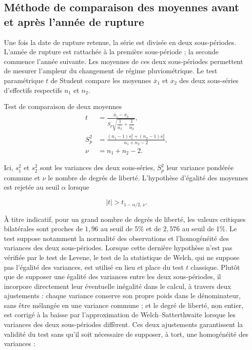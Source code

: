 \documentclass[12pt,a4paper]{report}
\begin{document}
\subsection{Méthode de comparaison des moyennes avant et après l'année de rupture}

Une fois la date de rupture retenue, la série est divisée en deux sous-périodes. L'année de rupture est rattachée à la première sous-période ; la seconde commence l'année suivante. Les moyennes de ces deux sous-périodes permettent de mesurer l'ampleur du changement de régime pluviométrique. Le test paramétrique $t$ de Student compare les moyennes $\overline{x}_1$ et $\overline{x}_2$ des deux sous-séries d'effectifs respectifs $n_1$ et $n_2$.

\begin{formulabox}{Test de comparaison de deux moyennes}
\begin{align}
t&=\frac{\overline{x}_1-\overline{x}_2}
{S_p\sqrt{\dfrac{1}{n_1}+\dfrac{1}{n_2}}},
\label{eq:student-t}\\[2mm]
S_p^2&=\frac{(n_1-1)s_1^2+(n_2-1)s_2^2}
{n_1+n_2-2},
\label{eq:variance-pooled}\\[1mm]
\nu&=n_1+n_2-2.
\label{eq:student-ddl}
\end{align}
\end{formulabox}

Ici, $s_1^2$ et $s_2^2$ sont les variances des deux sous-séries, $S_p^2$ leur variance pondérée commune et $\nu$ le nombre de degrés de liberté. L'hypothèse d'égalité des moyennes est rejetée au seuil $\alpha$ lorsque

\begin{equation}
|t|>t_{1-\alpha/2,\,\nu}.
\label{eq:student-decision}
\end{equation}

À titre indicatif, pour un grand nombre de degrés de liberté, les valeurs critiques bilatérales sont proches de $1{,}96$ au seuil de 5\% et de $2{,}576$ au seuil de 1\%. Le test suppose notamment la normalité des observations et l'homogénéité des variances des deux sous-périodes. Lorsque cette dernière hypothèse n'est pas vérifiée par le test de Levene, le test de la statistique de Welch, qui ne suppose pas l'égalité des variances, est utilisé en lieu et place du test $t$ classique. Plutôt que de supposer une égalité des variances entre les deux sous-périodes, il incorpore directement leur éventuelle inégalité dans le calcul, à travers deux ajustements : chaque variance conserve son propre poids dans le dénominateur, sans être mélangée en une variance commune ; et le degré de liberté, non entier, est corrigé à la baisse par l'approximation de Welch--Satterthwaite lorsque les variances des deux sous-périodes diffèrent. Ces deux ajustements garantissent la validité du test sans qu'il soit nécessaire de supposer, à tort, une homogénéité des variances :
\end{document}
